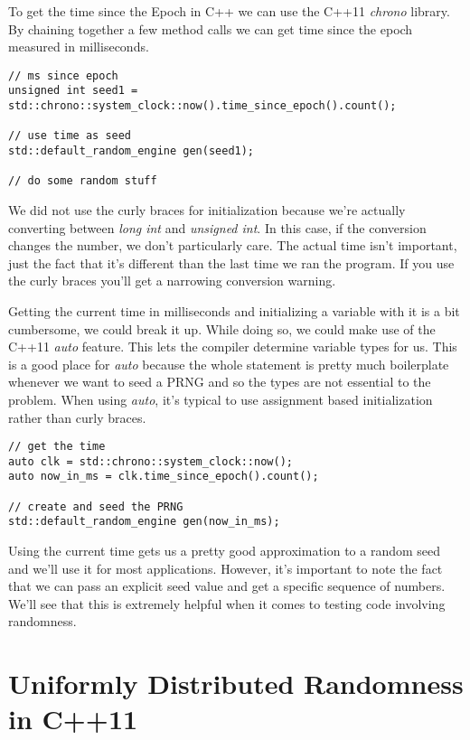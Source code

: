 \documentclass[]{tufte-handout}
\begin{document}
To get the time since the Epoch in C++ we can use the C++11 \textit{chrono} library. By chaining together a few method calls we can get time since the epoch measured in milliseconds.
\begin{verbatim}
// ms since epoch
unsigned int seed1 = std::chrono::system_clock::now().time_since_epoch().count();

// use time as seed
std::default_random_engine gen(seed1);

// do some random stuff
\end{verbatim}
We did not use the curly braces for initialization because we're actually converting between \textit{long int} and \textit{unsigned int}. In this case, if the conversion changes the number, we don't particularly care.  The actual time isn't important, just the fact that it's different than the last time we ran the program. If you use the curly braces you'll get a narrowing conversion warning.

Getting the current time in milliseconds and initializing a variable with it is a bit cumbersome, we could break it up. While doing so, we could make use of the C++11 \textit{auto} feature. This lets the compiler determine variable types for us. This is a good place for \textit{auto} because the whole statement is pretty much boilerplate whenever we want to seed a PRNG and so the types are not essential to the problem. When using \textit{auto}, it's typical to use assignment based initialization rather than curly braces.

\begin{verbatim}
// get the time
auto clk = std::chrono::system_clock::now();
auto now_in_ms = clk.time_since_epoch().count();

// create and seed the PRNG
std::default_random_engine gen(now_in_ms);
\end{verbatim}

Using the current time gets us a pretty good approximation to a random seed and we'll use it for most applications. However, it's important to note the fact that we can pass an explicit seed value and get a specific sequence of numbers.  We'll see that this is extremely helpful when it comes to testing code involving randomness.

\section{Uniformly Distributed Randomness in C++11}
\end{document}
